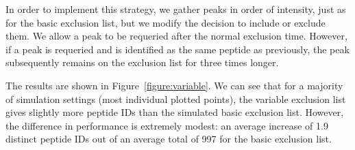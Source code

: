 \documentclass[12pt,twoside,openright]{report}
\begin{document}
In order to implement this strategy, we gather peaks in order of intensity, just
as for the basic exclusion list, but we modify the decision to include or
exclude them. We allow a peak to be requeried after the normal
exclusion time. However, if a peak is requeried and is identified as the same
peptide as previously, the peak subsequently remains on the exclusion list for
three times longer.

The results are shown in Figure~\ref{figure:variable}. We can see that for a
majority of simulation settings (most individual plotted points), the variable
exclusion list gives slightly more peptide IDs than the simulated basic
exclusion list. However, the difference in performance is extremely modest: an
average increase of 1.9 distinct peptide IDs out of an average total of 997 for
the basic exclusion list.
\end{document}

